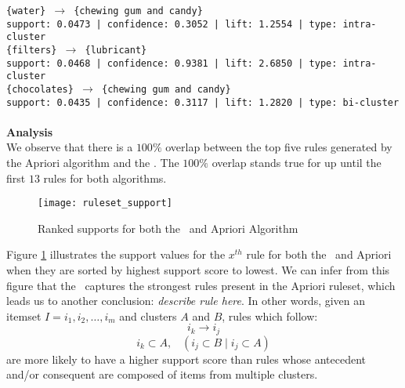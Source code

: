 \texttt{\{water\} $\rightarrow$ \{chewing gum and candy\}}\\\texttt{support: 0.0473 | confidence: 0.3052 | lift: 1.2554 | type: intra-cluster}\\
\texttt{\{filters\} $\rightarrow$ \{lubricant\}}\\\texttt{support: 0.0468 | confidence: 0.9381 | lift: 2.6850 | type: intra-cluster}\\
\texttt{\{chocolates\} $\rightarrow$ \{chewing gum and candy\}}\\\texttt{support: 0.0435 | confidence: 0.3117 | lift: 1.2820 | type: bi-cluster}\\
\\\textbf{Analysis}\\
We observe that there is a $100\%$ overlap between the top five rules generated by the Apriori algorithm and the \algo. The $100\%$ overlap stands true for up until the first $13$ rules for both algorithms. 
\begin{figure}[H]
\centering
\texttt{[image: ruleset\_support]}
\caption{Ranked supports for both the \algo\ and Apriori Algorithm}
\label{fig:rule_support}
\end{figure}
Figure \ref{fig:rule_support} illustrates the support values for the $x^{th}$ rule for both the \algo\ and Apriori when they are sorted by highest support score to lowest. We can infer from this figure that the \algo\ captures the strongest rules present in the Apriori ruleset, which leads us to another conclusion: \textit{describe rule here}. In other words, given an itemset $I = i_1,i_2,\dots,i_m$ and clusters $A$ and $B$, rules which follow:
\[
i_k \rightarrow i_j
\]
\[
i_k \subset A, \;\;\; (i_j \subset B \;|\; i_j \subset A)
\]
are more likely to have a higher support score than rules whose antecedent and/or consequent are composed of items from multiple clusters.